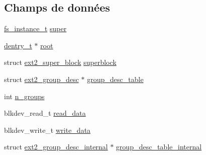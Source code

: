 \subsection*{Champs de données}
\begin{DoxyCompactItemize}
\item 
\hyperlink{vfs_8h_a0eefa9aac35a5462ebf1e038992ca860}{fs\+\_\+instance\+\_\+t} \hyperlink{struct__ext2__fs__instance__t_a456ee695fb1a0b71edadda9f4504ca2d}{super}
\item 
\hyperlink{vfs_8h_ade5c998c6b3f09d2cf45d0e5ef8787da}{dentry\+\_\+t} $\ast$ \hyperlink{struct__ext2__fs__instance__t_a52f883f2d709ab3b4dff94b5b7100973}{root}
\item 
struct \hyperlink{structext2__super__block}{ext2\+\_\+super\+\_\+block} \hyperlink{struct__ext2__fs__instance__t_a81ad8719743e20da6f661c2586b56ad2}{superblock}
\item 
struct \hyperlink{structext2__group__desc}{ext2\+\_\+group\+\_\+desc} $\ast$ \hyperlink{struct__ext2__fs__instance__t_acc01ef58cbc6cfa9d3ff4e08709a561a}{group\+\_\+desc\+\_\+table}
\item 
int \hyperlink{struct__ext2__fs__instance__t_a81a5e5b8f7d46d744c96a4f28317e59f}{n\+\_\+groups}
\item 
blkdev\+\_\+read\+\_\+t \hyperlink{struct__ext2__fs__instance__t_ac3ea85962b66914cb42ec884d70a853d}{read\+\_\+data}
\item 
blkdev\+\_\+write\+\_\+t \hyperlink{struct__ext2__fs__instance__t_a90d334c34e9aeea01be13fe1ed66ba7b}{write\+\_\+data}
\item 
struct \hyperlink{structext2__group__desc__internal}{ext2\+\_\+group\+\_\+desc\+\_\+internal} $\ast$ \hyperlink{struct__ext2__fs__instance__t_a9db69a1265be4c818005d18add117790}{group\+\_\+desc\+\_\+table\+\_\+internal}
\end{DoxyCompactItemize}


